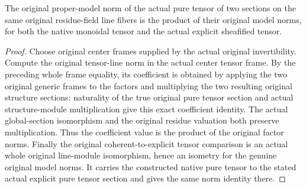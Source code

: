 \begin{theorem}
\label{thm:actual-model-line-tensor-norm}
\leanok
{}
The original proper-model norm of the actual pure tensor of two
sections on the same original residue-field line fibers is the
product of their original model norms, for both the native
monoidal tensor and the actual explicit sheafified tensor.
\end{theorem}
\begin{proof}
Choose original center frames supplied by the actual original
invertibility. Compute the original tensor-line norm in the actual
center tensor frame. By the preceding whole frame equality, its
coefficient is obtained by applying the two original generic
frames to the factors and multiplying the two resulting original
structure sections: naturality of the true original pure tensor
section and actual structure-module multiplication give this exact
coefficient identity. The actual global-section isomorphism and
the original residue valuation both preserve multiplication. Thus
the coefficient value is the product of the original factor norms.
Finally the original coherent-to-explicit tensor comparison is an
actual whole original line-module isomorphism, hence an isometry
for the genuine original model norms. It carries the constructed
native pure tensor to the stated actual explicit pure tensor
section and gives the same norm identity there.
\end{proof}
